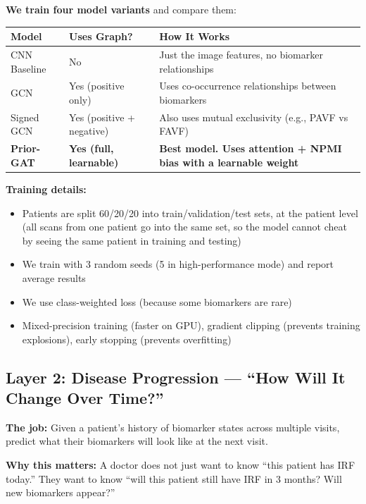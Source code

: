 \documentclass[12pt,a4paper]{article}
\begin{document}
\textbf{We train four model variants} and compare them:

\begin{table}[H]
\centering
\small
\begin{tabular}{@{}llp{7cm}@{}}
\toprule
\textbf{Model} & \textbf{Uses Graph?} & \textbf{How It Works} \\
\midrule
CNN Baseline & No & Just the image features, no biomarker relationships \\
GCN & Yes (positive only) & Uses co-occurrence relationships between biomarkers \\
Signed GCN & Yes (positive + negative) & Also uses mutual exclusivity (e.g., PAVF vs FAVF) \\
\textbf{Prior-GAT} & \textbf{Yes (full, learnable)} & \textbf{Best model. Uses attention + NPMI bias with a learnable weight} \\
\bottomrule
\end{tabular}
\end{table}

\textbf{Training details:}
\begin{itemize}[nosep]
  \item Patients are split 60/20/20 into train/validation/test sets, at the patient level (all scans from one patient go into the same set, so the model cannot cheat by seeing the same patient in training and testing)
  \item We train with 3 random seeds (5 in high-performance mode) and report average results
  \item We use class-weighted loss (because some biomarkers are rare)
  \item Mixed-precision training (faster on GPU), gradient clipping (prevents training explosions), early stopping (prevents overfitting)
\end{itemize}


\subsection{Layer 2: Disease Progression --- ``How Will It Change Over Time?''}

\textbf{The job:} Given a patient's history of biomarker states across multiple visits, predict what their biomarkers will look like at the next visit.

\textbf{Why this matters:} A doctor does not just want to know ``this patient has IRF today.'' They want to know ``will this patient still have IRF in 3 months? Will new biomarkers appear?''
\end{document}
